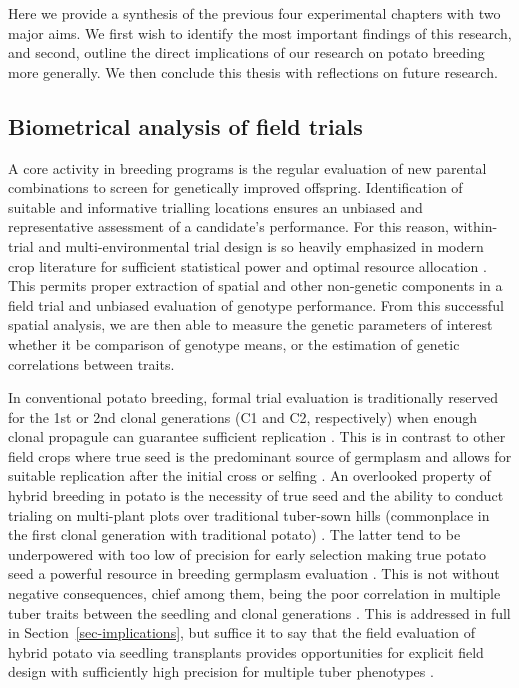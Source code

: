 \documentclass[
]{article}
\begin{document}
Here we provide a synthesis of the previous four experimental chapters
with two major aims. We first wish to identify the most important
findings of this research, and second, outline the direct implications
of our research on potato breeding more generally. We then conclude this
thesis with reflections on future research.

\subsection{Biometrical analysis of field
trials}\label{biometrical-analysis-of-field-trials}

A core activity in breeding programs is the regular evaluation of new
parental combinations to screen for genetically improved offspring.
Identification of suitable and informative trialling locations ensures
an unbiased and representative assessment of a candidate's performance.
For this reason, within-trial and multi-environmental trial design is so
heavily emphasized in modern crop literature for sufficient statistical
power and optimal resource allocation \autocite{Shoemaker2024}. This
permits proper extraction of spatial and other non-genetic components in
a field trial and unbiased evaluation of genotype performance. From this
successful spatial analysis, we are then able to measure the genetic
parameters of interest whether it be comparison of genotype means, or
the estimation of genetic correlations between traits.

In conventional potato breeding, formal trial evaluation is
traditionally reserved for the 1st or 2nd clonal generations (C1 and C2,
respectively) when enough clonal propagule can guarantee sufficient
replication \autocite{Gopal2015,Paget2017}. This is in contrast to other
field crops where true seed is the predominant source of germplasm and
allows for suitable replication after the initial cross or selfing
\autocite{Zystro2018}. An overlooked property of hybrid breeding in
potato is the necessity of true seed and the ability to conduct trialing
on multi-plant plots over traditional tuber-sown hills (commonplace in
the first clonal generation with traditional potato)
\autocite{Davies1974,Pallais1991}. The latter tend to be underpowered
with too low of precision for early selection making true potato seed a
powerful resource in breeding germplasm evaluation
\autocite{Storck2011,Stockem2021}. This is not without negative
consequences, chief among them, being the poor correlation in multiple
tuber traits between the seedling and clonal generations
\autocite{Ortiz1997,Anderson1981}. This is addressed in full in
Section~\ref{sec-implications}, but suffice it to say that the field
evaluation of hybrid potato via seedling transplants provides
opportunities for explicit field design with sufficiently high precision
for multiple tuber phenotypes \autocite{VanDijk2021a}.
\end{document}
